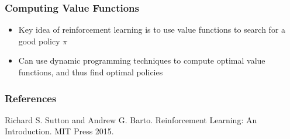 \documentclass{beamer}
\begin{document}

\begin{frame}
\frametitle{Computing Value Functions}
\begin{itemize}
\item Key idea of reinforcement learning is to use value functions to search for a good policy $\pi$
\item Can use dynamic programming techniques to compute optimal value functions, and thus find optimal policies
\end{itemize}
\end{frame}



\begin{frame}
\frametitle{References}

Richard S. Sutton and Andrew G. Barto. Reinforcement Learning: An Introduction. MIT Press 2015.

\end{frame}

\end{document}
